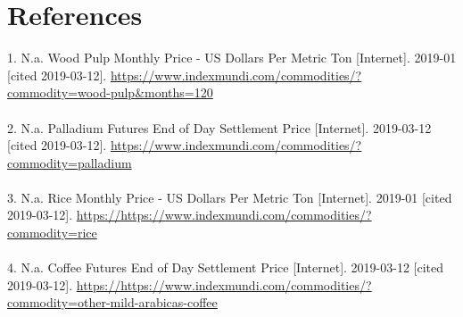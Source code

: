 \documentclass{article}
\begin{document}
	\section*{References}
	1. N.a. Wood Pulp Monthly Price - US Dollars Per Metric Ton [Internet]. 2019-01 [cited 2019-03-12]. \url{https://www.indexmundi.com/commodities/?commodity=wood-pulp&months=120}\\\\
	2. N.a. Palladium Futures End of Day Settlement Price [Internet]. 2019-03-12 [cited 2019-03-12]. \url{https://www.indexmundi.com/commodities/?commodity=palladium}\\\\
	3. N.a. Rice Monthly Price - US Dollars Per Metric Ton [Internet]. 2019-01 [cited 2019-03-12]. \url{https://https://www.indexmundi.com/commodities/?commodity=rice}\\\\
	4. N.a. Coffee Futures End of Day Settlement Price [Internet]. 2019-03-12 [cited 2019-03-12]. \url{https://https://www.indexmundi.com/commodities/?commodity=other-mild-arabicas-coffee}\\\\
\end{document}
